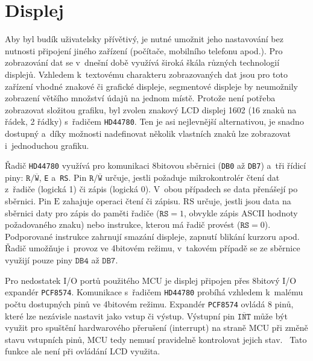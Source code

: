 \section{Displej}
Aby byl budík uživatelsky přívětivý, je nutné umožnit jeho nastavování bez
nutnosti připojení jiného zařízení (počítače, mobilního telefonu apod.).
Pro zobrazování dat se v~dnešní době využívá široká škála různých technologií
displejů. Vzhledem k~textovému charakteru zobrazovaných dat jsou pro toto
zařízení vhodné znakové či grafické displeje, segmentové displeje by neumožnily
zobrazení většího množství údajů na jednom místě. Protože není potřeba
zobrazovat složitou grafiku, byl zvolen znakový LCD displej 1602 (16 znaků na
řádek, 2 řádky) s~řadičem \texttt{HD44780}. Ten je asi nejlevnější
alternativou, je snadno dostupný a~díky možnosti nadefinovat několik vlastních
znaků lze zobrazovat i~jednoduchou grafiku.

Řadič \texttt{HD44780} využívá pro komunikaci 8bitovou sběrnici (\texttt{DB0}
až \texttt{DB7}) a~tři řídicí piny: $\texttt{R}/\overline{\texttt{W}}$,
\texttt{E} a~\texttt{RS}. Pin $\texttt{R}/\overline{\texttt{W}}$ určuje,
jestli požaduje mikrokontrolér čtení dat z~řadiče (logická 1)
či zápis (logická 0). V~obou případech se data přenášejí po sběrnici.
Pin $\mathrm{E}$ zahajuje operaci čtení či zápisu. $\mathrm{RS}$ určuje, jestli
jsou data na sběrnici daty pro zápis do paměti řadiče ($\texttt{RS} = 1$,
obvykle zápis ASCII hodnoty požadovaného znaku) nebo instrukce, kterou má řadič
provést ($\texttt{RS} = 0$). Podporované instrukce zahrnují smazání displeje,
zapnutí blikání kurzoru apod. Řadič umožňuje i~provoz ve 4bitovém režimu,
v~takovém případě se ze sběrnice využijí pouze piny $\texttt{DB4}$ až
$\texttt{DB7}$.~\cite{dshHD44780}

Pro nedostatek I/O portů použitého MCU je displej připojen přes
8bitový \IIC{} I/O expandér \texttt{PCF8574}. Komunikace s~řadičem
\texttt{HD44780} probíhá vzhledem k~malému počtu dostupných pinů ve 4bitovém
režimu. Expandér \texttt{PCF8574} ovládá 8 pinů, které lze nezávisle nastavit
jako vstup či výstup. Výstupní pin $\overline{\texttt{INT}}$ může být využit
pro spuštění hardwarového přerušení (interrupt) na straně MCU při změně stavu
vstupních pinů, MCU tedy nemusí pravidelně kontrolovat jejich
stav.~\cite{dshPCF8574} Tato funkce ale není při ovládání LCD využita.

